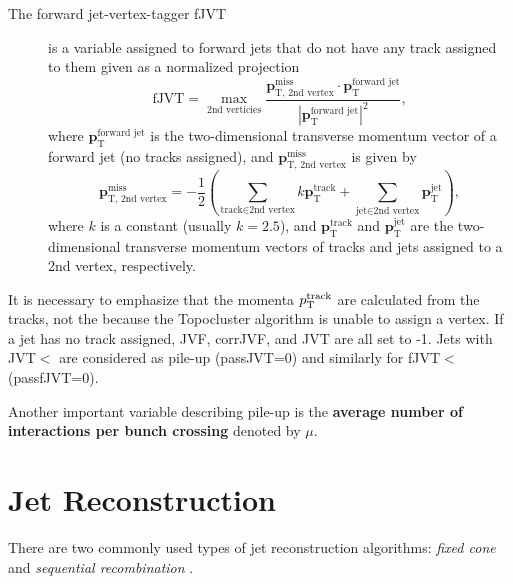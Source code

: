 \begin{description}
    \item[The forward jet-vertex-tagger fJVT] \cite{fjvt} is a variable assigned to forward jets that do not have any track assigned to them given as a normalized projection 
    \begin{equation}
        \label{eq:fjvt}
        \text{fJVT} = \max_{\text{2nd verticies}}{\frac{\textbf{p}^{\text{miss}}_{\text{T, 2nd vertex}} \cdot \textbf{p}_{\text{T}}^{\text{forward jet}}}{|\textbf{p}_{\text{T}}^{\text{forward jet}}|^2}},
    \end{equation}
    where $\textbf{p}_{\text{T}}^{\text{forward jet}}$ is the two-dimensional transverse momentum vector of a forward jet (no tracks assigned), and $\textbf{p}_{\text{T, 2nd vertex}}^{\text{miss}}$ is given by
    \begin{equation}
        \textbf{p}_{\text{T, 2nd vertex}}^{\text{miss}} = -\frac12\left(\sum_{\text{track} \in \text{2nd vertex}} k\textbf{p}_{\text{T}}^{\text{track}} 
        + \sum_{\text{jet} \in \text{2nd vertex} }\textbf{p}_{\text{T}}^{\text{jet}}\right),
    \end{equation}
    where $k$ is a constant (usually $k=2.5$), and $\textbf{p}_{\text{T}}^{\text{track}}$ and $\textbf{p}_{\text{T}}^{\text{jet}}$ are the two-dimensional transverse momentum vectors of tracks and jets assigned to a 2nd vertex, respectively.
\end{description}

It is necessary to emphasize that the momenta $p_\text{T}^{\text{track}}$ are calculated from the tracks, not the \PFOs because the Topocluster algorithm is unable to assign a vertex.
If a jet has no track assigned, JVF, corrJVF, and JVT are all set to -1.
Jets with JVT$<$ are considered as pile-up (passJVT=0) and similarly for fJVT$<$ (passfJVT=0).

Another important variable describing pile-up is the \textbf{average number of interactions per bunch crossing} denoted by $\mu$.

\section{Jet Reconstruction}
\label{sec:jet_reco}
There are two commonly used types of jet reconstruction algorithms: \emph{fixed cone} and \emph{sequential recombination} \cite{jet_reco_rev}.

